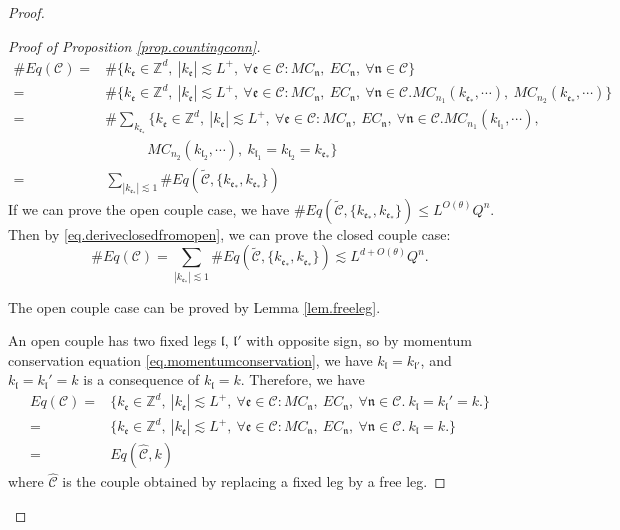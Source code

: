 \begin{proof}
\begin{proof}[Proof of Proposition \ref{prop.countingconn}]
\begin{equation}\label{eq.deriveclosedfromopen}
\begin{split}
\#Eq(\mathcal{C})=&\#\{k_{\mathfrak{e}}\in \mathbb{Z}^d,\ |k_{\mathfrak{e}}| \lesssim L^+,\ \forall \mathfrak{e}\in \mathcal{C}:MC_{\mathfrak{n}},\  EC_{\mathfrak{n}},\ \forall \mathfrak{n}\in \mathcal{C}\}    
\\
=&\#\{k_{\mathfrak{e}}\in \mathbb{Z}^d,\ |k_{\mathfrak{e}}| \lesssim L^+,\ \forall \mathfrak{e}\in \mathcal{C}:MC_{\mathfrak{n}},\  EC_{\mathfrak{n}},\ \forall \mathfrak{n}\in \mathcal{C}. MC_{n_1}(k_{\mathfrak{e}_*},\cdots),\ MC_{n_2}(k_{\mathfrak{e}_*},\cdots)\}    
\\
=&\#\sum_{k_{\mathfrak{e}_*}}\{k_{\mathfrak{e}}\in \mathbb{Z}^d,\ |k_{\mathfrak{e}}| \lesssim L^+,\ \forall \mathfrak{e}\in \mathcal{C}:MC_{\mathfrak{n}},\  EC_{\mathfrak{n}},\ \forall \mathfrak{n}\in \mathcal{C}. MC_{n_1}(k_{\mathfrak{l}_1},\cdots),
\\
&\qquad\quad MC_{n_2}(k_{\mathfrak{l}_2},\cdots),\ k_{\mathfrak{l}_1}=k_{\mathfrak{l}_2}=k_{\mathfrak{e}_*}\}    
\\
=&\sum_{|k_{\mathfrak{e}_*}|\lesssim 1} \#Eq(\widetilde{\mathcal{C}},\{k_{\mathfrak{e}_*},k_{\mathfrak{e}_*}\})
\end{split}
\end{equation}
If we can prove the open couple case, we have $\#Eq(\widetilde{\mathcal{C}},\{k_{\mathfrak{e}_*},k_{\mathfrak{e}_*}\})\le L^{O(\theta)} Q^{n}$. Then by \eqref{eq.deriveclosedfromopen}, we can prove the closed couple case:  
\begin{equation}
    \#Eq(\mathcal{C})=\sum_{|k_{\mathfrak{e}_*}|\lesssim 1} \#Eq(\widetilde{\mathcal{C}},\{k_{\mathfrak{e}_*},k_{\mathfrak{e}_*}\})\lesssim L^{d+O(\theta)} Q^{n}.
\end{equation}

The open couple case can be proved by Lemma \ref{lem.freeleg}.

An open couple has two fixed legs $\mathfrak{l}$, $\mathfrak{l}'$ with opposite sign, so by momentum conservation equation \eqref{eq.momentumconservation}, we have $k_{\mathfrak{l}}=k_{\mathfrak{l}'}$, and $k_{\mathfrak{l}}=k_{\mathfrak{l}}'=k$ is a consequence of $k_{\mathfrak{l}}=k$. Therefore, we have 
\begin{equation}\label{eq.stephatC}
\begin{split}
    Eq(\mathcal{C})=&\{k_{\mathfrak{e}}\in \mathbb{Z}^d,\ |k_{\mathfrak{e}}| \lesssim L^+,\ \forall \mathfrak{e}\in \mathcal{C}:MC_{\mathfrak{n}},\  EC_{\mathfrak{n}},\ \forall \mathfrak{n}\in \mathcal{C}.\ k_{\mathfrak{l}}=k_{\mathfrak{l}}'=k.\}  
    \\
    =& \{k_{\mathfrak{e}}\in \mathbb{Z}^d,\ |k_{\mathfrak{e}}| \lesssim L^+,\ \forall \mathfrak{e}\in \mathcal{C}:MC_{\mathfrak{n}},\  EC_{\mathfrak{n}},\ \forall \mathfrak{n}\in \mathcal{C}.\ k_{\mathfrak{l}}=k.\}  
    \\
    =&Eq(\widehat{\mathcal{C}},k)
\end{split}
\end{equation}
where $\widehat{\mathcal{C}}$ is the couple obtained by replacing a fixed leg by a free leg.


\end{proof}
\end{proof}
